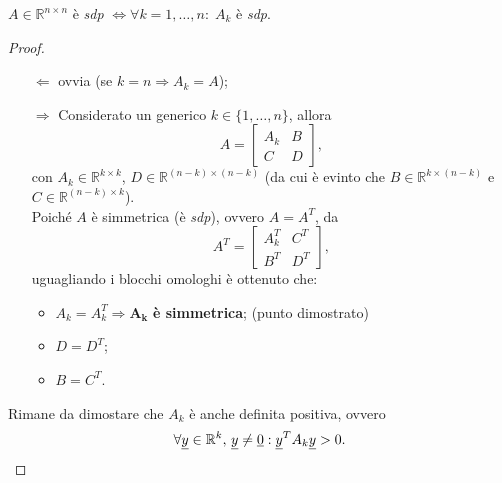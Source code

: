 \begin{theorem}\label{th:A_sdp_sse_Ak_sdp}
    $A\in\mathbb R^{n\times n}$ è \textit{sdp} $\iff\forall k=1,\hdots, n:\; A_k$ è \textit{sdp}.
\end{theorem}
\begin{proof}
    \begin{itemize}
        \item[$\Leftarrow$] ovvia (se $k=n\Rightarrow A_k=A$);
        \item[$\Rightarrow$] Considerato un generico $k\in\{1,\hdots,n\}$, allora
        \begin{equation*}
            A=\left[
            \begin{array}{c|c}
            A_k & B\\
            \hline
            C & D
        \end{array}\right],
        \end{equation*}
        con $A_k\in\mathbb R^{k\times k}$, $D\in\mathbb R^{(n-k)\times (n-k)}$ (da cui è evinto che $B\in\mathbb R^{k\times (n-k)}$ e $C\in\mathbb R^{(n-k)\times k}$).\\
        Poiché $A$ è simmetrica (è \textit{sdp}), ovvero $A=A^T$, da
        \begin{equation*}
            A^T=\left[\begin{array}{c|c}
            A_k^T & C^T\\
            \hline
            B^T & D^T
        \end{array}\right],
        \end{equation*}
        uguagliando i blocchi omologhi è ottenuto che:
        \begin{itemize}
            \item $A_k=A_k^T\boldsymbol{\Rightarrow A_k}$ \textbf{è simmetrica}; (punto dimostrato)
            \item $D=D^T$;
            \item $B=C^T$.
        \end{itemize}
    \end{itemize}
    
    Rimane da dimostare che $A_k$ è anche definita positiva, ovvero
    \begin{equation*}
        \forall\uline y\in\mathbb R^k,\,\uline y\neq \uline 0 : \uline y^T A_k \uline y>0.
    \end{equation*}
    

\end{proof}
